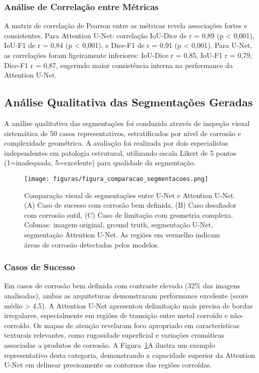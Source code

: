 \documentclass[12pt,a4paper,twoside]{article}
\begin{document}
\subsubsection{Análise de Correlação entre Métricas}

A matriz de correlação de Pearson entre as métricas revela associações fortes e consistentes. Para Attention U-Net: correlação IoU-Dice de r = 0,89 (p < 0,001), IoU-F1 de r = 0,84 (p < 0,001), e Dice-F1 de r = 0,91 (p < 0,001). Para U-Net, as correlações foram ligeiramente inferiores: IoU-Dice r = 0,85, IoU-F1 r = 0,79, Dice-F1 r = 0,87, sugerindo maior consistência interna na performance da Attention U-Net.

\subsection{Análise Qualitativa das Segmentações Geradas}
\label{subsec:analise_qualitativa}

A análise qualitativa das segmentações foi conduzida através de inspeção visual sistemática de 50 casos representativos, estratificados por nível de corrosão e complexidade geométrica. A avaliação foi realizada por dois especialistas independentes em patologia estrutural, utilizando escala Likert de 5 pontos (1=inadequada, 5=excelente) para qualidade da segmentação.

\begin{figure}[H]
    \centering
    \texttt{[image: figuras/figura\_comparacao\_segmentacoes.png]}
    \caption{Comparação visual de segmentações entre U-Net e Attention U-Net. (A) Caso de sucesso com corrosão bem definida, (B) Caso desafiador com corrosão sutil, (C) Caso de limitação com geometria complexa. Colunas: imagem original, ground truth, segmentação U-Net, segmentação Attention U-Net. As regiões em vermelho indicam áreas de corrosão detectadas pelos modelos.}
    \label{fig:comparacao_segmentacoes}
\end{figure}

\subsubsection{Casos de Sucesso}

Em casos de corrosão bem definida com contraste elevado (32\% das imagens analisadas), ambas as arquiteturas demonstraram performance excelente (score médio > 4,5). A Attention U-Net apresentou delimitação mais precisa de bordas irregulares, especialmente em regiões de transição entre metal corroído e não-corroído. Os mapas de atenção revelaram foco apropriado em características texturais relevantes, como rugosidade superficial e variações cromáticas associadas a produtos de corrosão. A Figura~\ref{fig:comparacao_segmentacoes}A ilustra um exemplo representativo desta categoria, demonstrando a capacidade superior da Attention U-Net em delinear precisamente os contornos das regiões corroídas.
\end{document}
